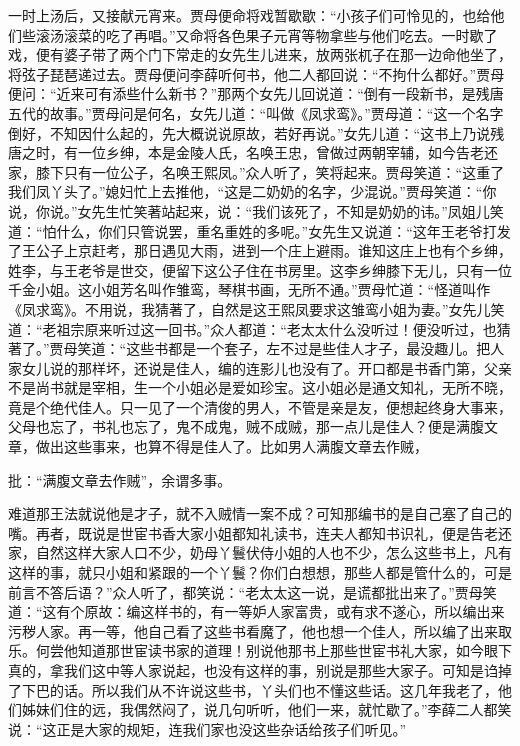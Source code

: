 \begin{parag}
    一时上汤后，又接献元宵来。贾母便命将戏暂歇歇：“小孩子们可怜见的，也给他们些滚汤滚菜的吃了再唱。”又命将各色果子元宵等物拿些与他们吃去。一时歇了戏，便有婆子带了两个门下常走的女先生儿进来，放两张杌子在那一边命他坐了，将弦子琵琶递过去。贾母便问李薛听何书，他二人都回说：“不拘什么都好。”贾母便问：“近来可有添些什么新书？”那两个女先儿回说道：“倒有一段新书，是残唐五代的故事。”贾母问是何名，女先儿道：“叫做《凤求鸾》。”贾母道：“这一个名字倒好，不知因什么起的，先大概说说原故，若好再说。”女先儿道：“这书上乃说残唐之时，有一位乡绅，本是金陵人氏，名唤王忠，曾做过两朝宰辅，如今告老还家，膝下只有一位公子，名唤王熙凤。”众人听了，笑将起来。贾母笑道：“这重了我们凤丫头了。”媳妇忙上去推他，“这是二奶奶的名字，少混说。”贾母笑道：“你说，你说。”女先生忙笑著站起来，说：“我们该死了，不知是奶奶的讳。”凤姐儿笑道：“怕什么，你们只管说罢，重名重姓的多呢。”女先生又说道：“这年王老爷打发了王公子上京赶考，那日遇见大雨，进到一个庄上避雨。谁知这庄上也有个乡绅，姓李，与王老爷是世交，便留下这公子住在书房里。这李乡绅膝下无儿，只有一位千金小姐。这小姐芳名叫作雏鸾，琴棋书画，无所不通。”贾母忙道：“怪道叫作《凤求鸾》。不用说，我猜著了，自然是这王熙凤要求这雏鸾小姐为妻。”女先儿笑道：“老祖宗原来听过这一回书。”众人都道：“老太太什么没听过！便没听过，也猜著了。”贾母笑道：“这些书都是一个套子，左不过是些佳人才子，最没趣儿。把人家女儿说的那样坏，还说是佳人，编的连影儿也没有了。开口都是书香门第，父亲不是尚书就是宰相，生一个小姐必是爱如珍宝。这小姐必是通文知礼，无所不晓，竟是个绝代佳人。只一见了一个清俊的男人，不管是亲是友，便想起终身大事来，父母也忘了，书礼也忘了，鬼不成鬼，贼不成贼，那一点儿是佳人？便是满腹文章，做出这些事来，也算不得是佳人了。比如男人满腹文章去作贼，\begin{note}批：“满腹文章去作贼”，余谓多事。\end{note}难道那王法就说他是才子，就不入贼情一案不成？可知那编书的是自己塞了自己的嘴。再者，既说是世宦书香大家小姐都知礼读书，连夫人都知书识礼，便是告老还家，自然这样大家人口不少，奶母丫鬟伏侍小姐的人也不少，怎么这些书上，凡有这样的事，就只小姐和紧跟的一个丫鬟？你们白想想，那些人都是管什么的，可是前言不答后语？”众人听了，都笑说：“老太太这一说，是谎都批出来了。”贾母笑道：“这有个原故：编这样书的，有一等妒人家富贵，或有求不遂心，所以编出来污秽人家。再一等，他自己看了这些书看魔了，他也想一个佳人，所以编了出来取乐。何尝他知道那世宦读书家的道理！别说他那书上那些世宦书礼大家，如今眼下真的，拿我们这中等人家说起，也没有这样的事，别说是那些大家子。可知是诌掉了下巴的话。所以我们从不许说这些书，丫头们也不懂这些话。这几年我老了，他们姊妹们住的远，我偶然闷了，说几句听听，他们一来，就忙歇了。”李薛二人都笑说：“这正是大家的规矩，连我们家也没这些杂话给孩子们听见。”
\end{parag}


